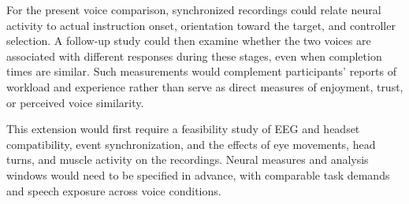 For the present voice comparison, synchronized recordings could relate neural activity to actual instruction onset, orientation toward the target, and controller selection. A follow-up study could then examine whether the two voices are associated with different responses during these stages, even when completion times are similar. Such measurements would complement participants' reports of workload and experience rather than serve as direct measures of enjoyment, trust, or perceived voice similarity.

This extension would first require a feasibility study of EEG and headset compatibility, event synchronization, and the effects of eye movements, head turns, and muscle activity on the recordings. Neural measures and analysis windows would need to be specified in advance, with comparable task demands and speech exposure across voice conditions.
